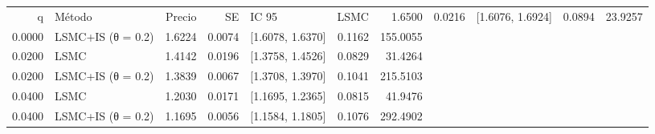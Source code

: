 \begin{tabular}{rlrrlrr}
\toprule
q & Método & Precio & SE & IC 95 %
 & LSMC & 1.6500 & 0.0216 & [1.6076, 1.6924] & 0.0894 & 23.9257 \\
0.0000 & LSMC+IS (θ = 0.2) & 1.6224 & 0.0074 & [1.6078, 1.6370] & 0.1162 & 155.0055 \\
0.0200 & LSMC & 1.4142 & 0.0196 & [1.3758, 1.4526] & 0.0829 & 31.4264 \\
0.0200 & LSMC+IS (θ = 0.2) & 1.3839 & 0.0067 & [1.3708, 1.3970] & 0.1041 & 215.5103 \\
0.0400 & LSMC & 1.2030 & 0.0171 & [1.1695, 1.2365] & 0.0815 & 41.9476 \\
0.0400 & LSMC+IS (θ = 0.2) & 1.1695 & 0.0056 & [1.1584, 1.1805] & 0.1076 & 292.4902 \\
\bottomrule
\end{tabular}

